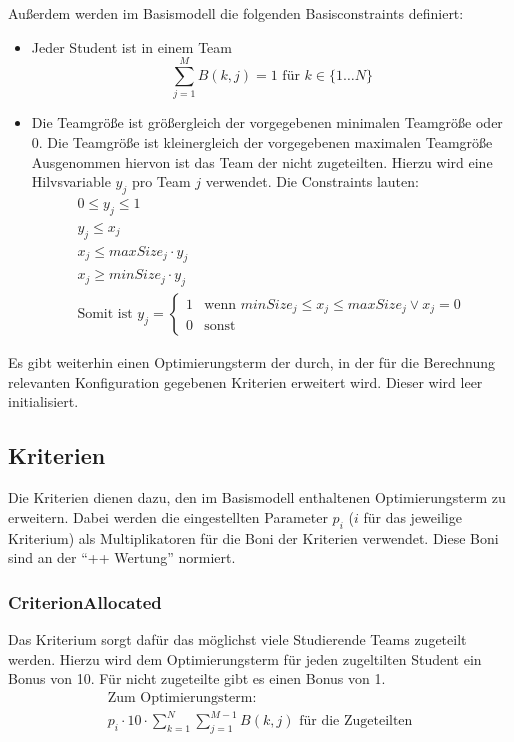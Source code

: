 \documentclass[parskip=full]{scrartcl}
\begin{document}
Außerdem werden im Basismodell die folgenden Basisconstraints definiert:



 \begin{itemize}
   \item Jeder Student ist in einem Team \begin{equation*}
   \sum_{j = 1}^{M} B(k,j) = 1 \text{ für } k \in \{ 1\ldots N \}
   \end{equation*}
   \item Die Teamgröße ist größergleich der vorgegebenen minimalen Teamgröße
   oder 0. Die Teamgröße ist kleinergleich der vorgegebenen maximalen Teamgröße
   Ausgenommen hiervon ist das Team der nicht zugeteilten. Hierzu wird eine
   Hilvsvariable $y_j$ pro Team $j$ verwendet. Die Constraints lauten:
   \begin{gather*}
    0 \le y_j \le 1\\
     y_j \le x_j\\ 
    x_j \le maxSize_j \cdot y_j \\ 
    x_j \ge minSize_j \cdot y_j \\
    \text{Somit ist } y_j = \begin{cases}
    1 & \text{wenn $minSize_j \le x_j \le maxSize_j \vee x_j = 0$} \\
    0 & \text{sonst} 
    \end{cases}
   \end{gather*}
 \end{itemize}
 
 Es gibt weiterhin einen Optimierungsterm der durch, in der für die Berechnung
 relevanten Konfiguration gegebenen Kriterien erweitert wird. Dieser wird leer
 initialisiert.


\subsection{Kriterien}
Die Kriterien dienen dazu, den im Basismodell enthaltenen Optimierungsterm zu
erweitern. Dabei werden die eingestellten Parameter $p_i$ ($i$ für das
jeweilige Kriterium) als Multiplikatoren für die Boni der Kriterien verwendet.
Diese Boni sind an der \enquote{++ Wertung} normiert. 

\subsubsection{CriterionAllocated}
Das Kriterium sorgt dafür das möglichst viele Studierende Teams zugeteilt
werden. Hierzu wird dem Optimierungsterm für jeden zugeltilten Student ein Bonus
von 10. Für nicht zugeteilte gibt es einen Bonus von 1. \begin{gather*}
\text{Zum Optimierungsterm:}\\
p_i \cdot 10 \cdot \sum_{k = 1}^{N} \sum_{j = 1}^{M-1} B(k,j) \text{ für die
Zugeteilten}
\end{gather*}
\end{document}
